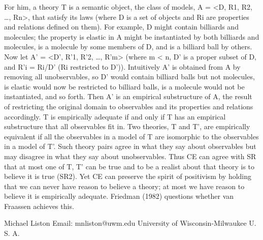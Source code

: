For him, a theory T is a semantic object, the class of models, A = <D, R1, R2,
…, Rn>, that satisfy its laws (where D is a set of objects and Ri are
properties and relations defined on them). For example, D might contain
billiards and molecules; the property is elastic in A might be instantiated by
both billiards and molecules, is a molecule by some members of D, and is a
billiard ball by others. Now let A’ = <D’, R’1, R’2, …, R’m> (where m < n, D’
is a proper subset of D, and R’i = Ri/D’ (Ri restricted to D’)). Intuitively A’
is obtained from A by removing all unobservables, so D’ would contain billiard
balls but not molecules, is elastic would now be restricted to billiard balls,
is a molecule would not be instantiated, and so forth. Then A’ is an empirical
substructure of A, the result of restricting the original domain to observables
and its properties and relations accordingly. T is empirically adequate if and
only if T has an empirical substructure that all observables fit in. Two
theories, T and T’, are empirically equivalent if all the observables in a
model of T are isomorphic to the observables in a model of T’. Such theory
pairs agree in what they say about observables but may disagree in what they
say about unobservables. Thus CE can agree with SR that at most one of T, T’
can be true and to be a realist about that theory is to believe it is true
(SR2). Yet CE can preserve the spirit of positivism by holding that we can
never have reason to believe a theory; at most we have reason to believe it is
empirically adequate. Friedman (1982) questions whether van Fraassen achieves
this.


Michael Liston Email: mnliston@uwm.edu University of Wisconsin-Milwaukee U. S.
A.
